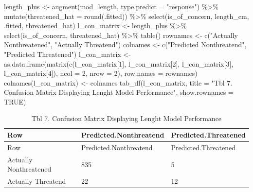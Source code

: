 \documentclass[
  letterpaper,
  DIV=11,
  numbers=noendperiod]{scrartcl}
\newenvironment{Shaded}{\begin{snugshade}}{\end{snugshade}}
\newcommand{\AttributeTok}[1]{\textcolor[rgb]{0.40,0.45,0.13}{#1}}
\newcommand{\ConstantTok}[1]{\textcolor[rgb]{0.56,0.35,0.01}{#1}}
\newcommand{\DecValTok}[1]{\textcolor[rgb]{0.68,0.00,0.00}{#1}}
\newcommand{\FunctionTok}[1]{\textcolor[rgb]{0.28,0.35,0.67}{#1}}
\newcommand{\NormalTok}[1]{\textcolor[rgb]{0.00,0.23,0.31}{#1}}
\newcommand{\OtherTok}[1]{\textcolor[rgb]{0.00,0.23,0.31}{#1}}
\newcommand{\SpecialCharTok}[1]{\textcolor[rgb]{0.37,0.37,0.37}{#1}}
\newcommand{\StringTok}[1]{\textcolor[rgb]{0.13,0.47,0.30}{#1}}
\begin{document}
\begin{Shaded}
\begin{Highlighting}[]
\NormalTok{length\_plus }\OtherTok{\textless{}{-}} \FunctionTok{augment}\NormalTok{(mod\_length, }\AttributeTok{type.predict =} \StringTok{"response"}\NormalTok{) }\SpecialCharTok{\%\textgreater{}\%}
  \FunctionTok{mutate}\NormalTok{(}\AttributeTok{threatened\_hat =} \FunctionTok{round}\NormalTok{(.fitted)) }\SpecialCharTok{\%\textgreater{}\%}
  \FunctionTok{select}\NormalTok{(is\_of\_concern, length\_cm, .fitted, threatened\_hat)}
\NormalTok{l\_con\_matrix }\OtherTok{\textless{}{-}}\NormalTok{ length\_plus }\SpecialCharTok{\%\textgreater{}\%}
  \FunctionTok{select}\NormalTok{(is\_of\_concern, threatened\_hat) }\SpecialCharTok{\%\textgreater{}\%}
  \FunctionTok{table}\NormalTok{()}
\NormalTok{rownames }\OtherTok{\textless{}{-}} \FunctionTok{c}\NormalTok{(}\StringTok{"Actually Nonthreatened"}\NormalTok{, }\StringTok{"Actually Threatend"}\NormalTok{)}
\NormalTok{colnames }\OtherTok{\textless{}{-}} \FunctionTok{c}\NormalTok{(}\StringTok{"Predicted Nonthreatend"}\NormalTok{, }\StringTok{"Predicted Threatened"}\NormalTok{)}
\NormalTok{l\_con\_matrix }\OtherTok{\textless{}{-}} \FunctionTok{as.data.frame}\NormalTok{(}\FunctionTok{matrix}\NormalTok{(}\FunctionTok{c}\NormalTok{(l\_con\_matrix[}\DecValTok{1}\NormalTok{], }
\NormalTok{                                       l\_con\_matrix[}\DecValTok{2}\NormalTok{], }
\NormalTok{                                       l\_con\_matrix[}\DecValTok{3}\NormalTok{], }
\NormalTok{                                       l\_con\_matrix[}\DecValTok{4}\NormalTok{]), }
                                     \AttributeTok{ncol =} \DecValTok{2}\NormalTok{, }
                                     \AttributeTok{nrow =} \DecValTok{2}\NormalTok{),}
                              \AttributeTok{row.names =}\NormalTok{ rownames)}
\FunctionTok{colnames}\NormalTok{(l\_con\_matrix) }\OtherTok{\textless{}{-}}\NormalTok{ colnames}
\FunctionTok{tab\_df}\NormalTok{(l\_con\_matrix,}
       \AttributeTok{title =} \StringTok{"Tbl 7. Confusion Matrix Displaying Lenght Model Performance"}\NormalTok{,}
       \AttributeTok{show.rownames =} \ConstantTok{TRUE}\NormalTok{)}
\end{Highlighting}
\end{Shaded}

\begin{longtable}[]{@{}lll@{}}
\caption{Tbl 7. Confusion Matrix Displaying Lenght Model
Performance}\tabularnewline
\toprule()
Row & Predicted.Nonthreatend & Predicted.Threatened \\
\midrule()
\endfirsthead
\toprule()
Row & Predicted.Nonthreatend & Predicted.Threatened \\
\midrule()
\endhead
Actually Nonthreatened & 835 & 5 \\
Actually Threatend & 22 & 12 \\
\bottomrule()
\end{longtable}
\end{document}
